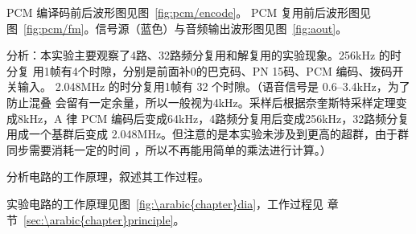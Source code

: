 \documentclass[../main]{subfiles}
\begin{document}
\begin{Answer}
  PCM 编译码前后波形图见图~\ref{fig:pcm/encode}。 PCM 复用前后波形图见
  图~\ref{fig:pcm/fm}。信号源（蓝色）与音频输出波形图见图~\ref{fig:aout}。

  分析：本实验主要观察了4路、32路频分复用和解复用的实验现象。256kHz 的时分复
  用1帧有4个时隙，分别是前面补0的巴克码、PN 15码、PCM 编码、拨码开关输入。
  2.048MHz 的时分复用1帧有 32 个时隙。（语音信号是 0.6--3.4kHz，为了防止混叠
  会留有一定余量，所以一般视为4kHz。采样后根据奈奎斯特采样定理变成8kHz，A 律
  PCM 编码后变成64kHz，4路频分复用后变成256kHz，32路频分复用成一个基群后变成
  2.048MHz。但注意的是本实验未涉及到更高的超群，由于群同步需要消耗一定的时间
  ，所以不再能用简单的乘法进行计算。）
\end{Answer}

\begin{Exercise}
  分析电路的工作原理，叙述其工作过程。
\end{Exercise}

\begin{Answer}
  实验电路的工作原理见图~\ref{fig:\arabic{chapter}dia}，工作过程见
  章节~\ref{sec:\arabic{chapter}principle}。
\end{Answer}
\end{document}
